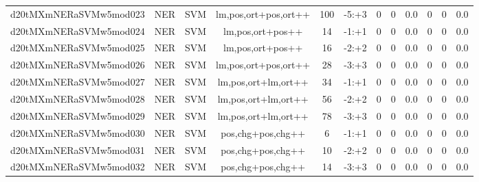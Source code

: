 \documentclass[a4paper]{article}
\begin{document}
\begin{landscape}
\begin{center}
\begin{tabular}{ |c|c|c|c|c|c|c|c|c|c|c|c|}
 
 	
 	\small{ d20tMXmNERaSVMw5mod023 } & \small{ NER} & \small{  SVM }  & lm,pos,ort+pos,ort++  &  100 &  \small{  -5:+3 }  &  0 & 0 & 0.0  &  0 & 0 & 0.0 \\
 	

 
 	
 	\small{ d20tMXmNERaSVMw5mod024 } & \small{ NER} & \small{  SVM }  & lm,pos,ort+pos++  &  14 &  \small{  -1:+1 }  &  0 & 0 & 0.0  &  0 & 0 & 0.0 \\
 	

 
 	
 	\small{ d20tMXmNERaSVMw5mod025 } & \small{ NER} & \small{  SVM }  & lm,pos,ort+pos++  &  16 &  \small{  -2:+2 }  &  0 & 0 & 0.0  &  0 & 0 & 0.0 \\
 	

 
 	
 	\small{ d20tMXmNERaSVMw5mod026 } & \small{ NER} & \small{  SVM }  & lm,pos,ort+pos,ort++  &  28 &  \small{  -3:+3 }  &  0 & 0 & 0.0  &  0 & 0 & 0.0 \\
 	

 
 	
 	\small{ d20tMXmNERaSVMw5mod027 } & \small{ NER} & \small{  SVM }  & lm,pos,ort+lm,ort++  &  34 &  \small{  -1:+1 }  &  0 & 0 & 0.0  &  0 & 0 & 0.0 \\
 	

 
 	
 	\small{ d20tMXmNERaSVMw5mod028 } & \small{ NER} & \small{  SVM }  & lm,pos,ort+lm,ort++  &  56 &  \small{  -2:+2 }  &  0 & 0 & 0.0  &  0 & 0 & 0.0 \\
 	

 
 	
 	\small{ d20tMXmNERaSVMw5mod029 } & \small{ NER} & \small{  SVM }  & lm,pos,ort+lm,ort++  &  78 &  \small{  -3:+3 }  &  0 & 0 & 0.0  &  0 & 0 & 0.0 \\
 	

 
 	
 	\small{ d20tMXmNERaSVMw5mod030 } & \small{ NER} & \small{  SVM }  & pos,chg+pos,chg++  &  6 &  \small{  -1:+1 }  &  0 & 0 & 0.0  &  0 & 0 & 0.0 \\
 	

 
 	
 	\small{ d20tMXmNERaSVMw5mod031 } & \small{ NER} & \small{  SVM }  & pos,chg+pos,chg++  &  10 &  \small{  -2:+2 }  &  0 & 0 & 0.0  &  0 & 0 & 0.0 \\
 	

 
 	
 	\small{ d20tMXmNERaSVMw5mod032 } & \small{ NER} & \small{  SVM }  & pos,chg+pos,chg++  &  14 &  \small{  -3:+3 }  &  0 & 0 & 0.0  &  0 & 0 & 0.0 \\
 	


\end{tabular}
\end{center}
\end{landscape}
\end{document}

